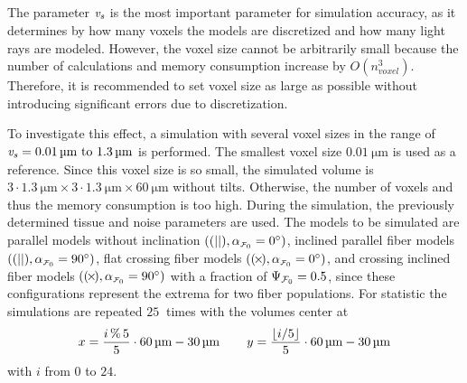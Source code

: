 \subsection{\Voxelsize{} \texorpdfstring{\voxelsize{}}{}}
%
The parameter \Voxelsize{} $\textnormal{$\mathit{v_{s}}$}$ is the most important parameter for simulation accuracy, as it determines by how many voxels the models are discretized and how many light rays are modeled.
However, the voxel size cannot be arbitrarily small because the number of calculations and memory consumption increase by $O(n_{\mathit{voxel}}^3)$.
Therefore, it is recommended to set voxel size as large as possible without introducing significant errors due to discretization.
\par
%
To investigate this effect, a simulation with several voxel sizes in the range of $\voxelsize = \SIrange{0.01}{1.3}{\micro\meter}$ is performed.
The smallest voxel size $\SI{0.01}{\micro\meter}$ is used as a reference.
Since this voxel size is so small, the simulated volume is $3 \cdot \SI{1.3}{\micro\meter} \times 3 \cdot \SI{1.3}{\micro\meter} \times \SI{60}{\micro\meter}$ without tilts.
Otherwise, the number of voxels and thus the memory consumption is too high.
During the simulation, the previously determined tissue and noise parameters are used.
The models to be simulated are parallel models without inclination $\left( \pfbs, \modelInc = \SI{0}{\degree} \right)$, inclined parallel fiber models $\left( \pfbs, \modelInc = \SI{90}{\degree} \right)$, flat crossing fiber models $\left( \cfbs, \modelInc = \SI{0}{\degree} \right)$, and crossing inclined fiber models $\left( \cfbs, \modelInc = \SI{90}{\degree} \right)$ with a fraction of $\textnormal{$\Psi_{\textnormal{$\mathcal{F}_0$}}$} = \SI{0.5}{}$, since these configurations represent the extrema for two fiber populations.
For statistic the simulations are repeated $\SI{25}{}$ times with the volumes center at
\begin{align}
    x=\frac{i\,\%\,5}{5} \cdot \SI{60}{\micro\meter} - \SI{30}{\micro\meter} \hspace{5ex}
    y=\frac{\lfloor i/5\rfloor}{5} \cdot \SI{60}{\micro\meter} - \SI{30}{\micro\meter} 
\end{align}
with $i$ from $0$ to $24$.
% 
% 
% 
